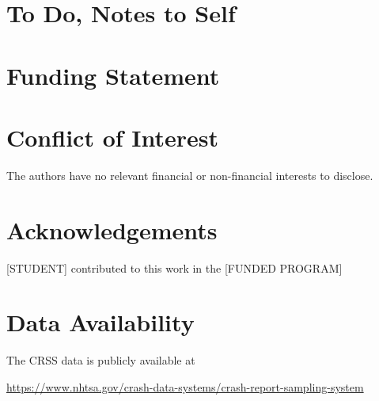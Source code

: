 \documentclass[fleqn]{cas-sc}
\begin{document}
\section{To Do, Notes to Self}
%

\section*{Funding Statement}

\section*{Conflict of Interest}

The authors have no relevant financial or non-financial interests to disclose.

\section*{Acknowledgements}

[STUDENT]
contributed to this work in the 
[FUNDED PROGRAM]

\section*{Data Availability}

The CRSS data is publicly available at 

\url{https://www.nhtsa.gov/crash-data-systems/crash-report-sampling-system}


\begin{comment}
\begin{figure}[<options>]
	\centering
		\texttt{[image: ]}
	  \caption{}\label{fig1}
\end{figure}


\begin{table}[<options>]
\caption{}\label{tbl1}
\begin{tabular*}{\tblwidth}{@{}LL@{}}
\toprule
  &  \\ %
\midrule
 & \\
 & \\
 & \\
 & \\
\bottomrule
\end{tabular*}
\end{table}
\end{comment}
\end{document}
